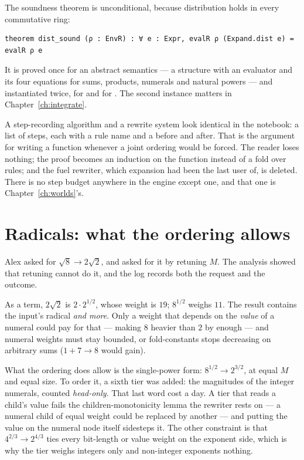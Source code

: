 The soundness theorem is unconditional, because distribution holds in every commutative ring:

\begin{verbatim}
theorem dist_sound (ρ : EnvR) : ∀ e : Expr, evalR ρ (Expand.dist e) = evalR ρ e
\end{verbatim}

It is proved once for an abstract semantics --- a structure  with an evaluator and its
four equations for sums, products, numerals and natural powers --- and instantiated twice, for
 and for . The second instance matters in Chapter~\ref{ch:integrate}.

\begin{logbox}
  A step-recording algorithm and a rewrite system look identical in the notebook: a list of
  steps, each with a rule name and a before and after. That is the argument for writing a
  function whenever a joint ordering would be forced. The reader loses nothing; the proof
  becomes an induction on the function instead of a fold over rules; and the fuel rewriter,
  which expansion had been the last user of, is deleted. There is no step budget anywhere in the
  engine except one, and that one is Chapter~\ref{ch:worlds}'s.
\end{logbox}

\section{Radicals: what the ordering allows}

Alex asked for $\sqrt 8 \to 2\sqrt 2$, and asked for it by retuning $M$. The analysis showed that
retuning cannot do it, and the log records both the request and the outcome.

As a term, $2\sqrt 2$ is $2 \cdot 2^{1/2}$, whose weight is $19$; $8^{1/2}$ weighs $11$. The result
contains the input's radical \emph{and more}. Only a weight that depends on the \emph{value} of a
numeral could pay for that --- making $8$ heavier than $2$ by enough --- and numeral weights must
stay bounded, or fold-constants stops decreasing on arbitrary sums ($1 + 7 \to 8$ would gain).

What the ordering does allow is the single-power form: $8^{1/2} \to 2^{3/2}$, at equal $M$ and
equal size. To order it, a sixth tier was added: the magnitudes of the integer numerals, counted
\emph{head-only}. That last word cost a day. A tier that reads a child's value fails the
children-monotonicity lemma the rewriter rests on --- a numeral child of equal weight could be
replaced by another --- and putting the value on the numeral node itself sidesteps it. The other
constraint is that $4^{2/3} \to 2^{4/3}$ ties every bit-length or value weight on the exponent
side, which is why the tier weighs integers only and non-integer exponents nothing.

